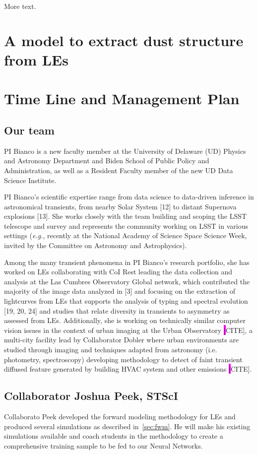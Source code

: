 \documentclass{proposalnsf}
\newcommand{\changeit}[1]{\colorbox{magenta}{#1}}
\newcommand{\eg}{\emph{e.g.}}
\begin{document}
More text.

\section{A model to extract dust structure from LEs}



\section{Time Line and Management Plan}

\subsection{Our team}
PI Bianco is a new faculty member at the University of Delaware (UD) Physics and Astronomy Department and Biden School of Public Policy and Administration,  as well as a Resident Faculty member of the new UD Data Science Institute.

PI Bianco’s scientific expertise range from data science to data-driven inference in astronomical transients, from nearby Solar System [12] to distant Supernova explosions [13].   She works closely with the team building and scoping the LSST telescope and survey and represents the community working on LSST in various settings (\eg,  recently at the National Academy of Science Space Science Week, invited by the Committee on Astronomy and Astrophysics).  

Among the many transient phenomena in PI Bianco’s research portfolio, she has worked on LEs collaborating with CoI Rest leading the data collection and analysis at the Las Cumbres Observatory Global network, which contributed the majority of the image data analyzed in [3] and focusing on the extraction of lightcurves from LEs that supports the analysis of typing and spectral evolution [19, 20, 24]
and studies that relate diversity in transients to asymmetry as assessed from LEs.  Additionally, she is working on technically similar computer vision issues in the context of urban imaging at the Urban Observatory \changeit[CITE], a multi-city facility lead by Collaborator Dobler where urban environments are studied through imaging and techniques adapted from astronomy (i.e.  photometry, spectroscopy) developing methodology to detect of faint transient diffused feature generated by building HVAC system and other emissions \changeit[CITE].

\subsection{Collaborator Joshua Peek, STScI}
Collaborato Peek developed the forward modeling methodology for LEs and produced several simulations as described in~\autoref{sec:fwm}.  He will make his existing simulations available and coach students in the methodology to create a comprehensive training sample to be fed to our Neural Networks.  
\end{document}
